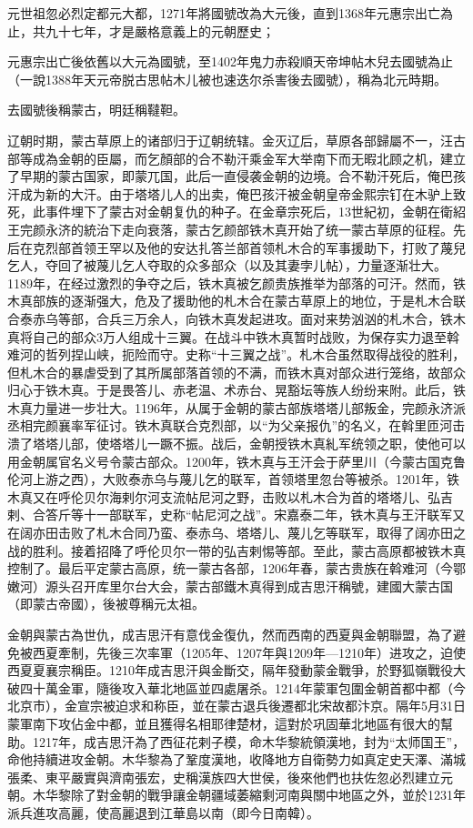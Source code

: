 元世祖忽必烈定都元大都，1271年將國號改為大元後，直到1368年元惠宗出亡為止，共九十七年，才是嚴格意義上的元朝歷史；

元惠宗出亡後依舊以大元為國號，至1402年鬼力赤殺順天帝坤帖木兒去國號為止（一說1388年天元帝脱古思帖木儿被也速迭尔杀害後去國號），稱為北元時期。

去國號後稱蒙古，明廷稱韃靼。

辽朝时期，蒙古草原上的诸部归于辽朝统辖。金灭辽后，草原各部歸屬不一，汪古部等成為金朝的臣屬，而乞顏部的合不勒汗乘金军大举南下而无暇北顾之机，建立了早期的蒙古国家，即蒙兀国，此后一直侵袭金朝的边境。合不勒汗死后，俺巴孩汗成为新的大汗。由于塔塔儿人的出卖，俺巴孩汗被金朝皇帝金熙宗钉在木驴上致死，此事件埋下了蒙古对金朝复仇的种子。在金章宗死后，13世紀初，金朝在衛紹王完颜永济的統治下走向衰落，蒙古乞颜部铁木真开始了统一蒙古草原的征程。先后在克烈部首领王罕以及他的安达扎答兰部首领札木合的军事援助下，打败了蔑兒乞人，夺回了被蔑儿乞人夺取的众多部众（以及其妻孛儿帖），力量逐渐壮大。1189年，在经过激烈的争夺之后，铁木真被乞颜贵族推举为部落的可汗。然而，铁木真部族的逐渐强大，危及了援助他的札木合在蒙古草原上的地位，于是札木合联合泰赤乌等部，合兵三万余人，向铁木真发起进攻。面对来势汹汹的札木合，铁木真将自己的部众3万人组成十三翼。在战斗中铁木真暂时战败，为保存实力退至斡难河的哲列捏山峡，扼险而守。史称“十三翼之战”。札木合虽然取得战役的胜利，但札木合的暴虐受到了其所属部落首领的不满，而铁木真对部众进行笼络，故部众归心于铁木真。于是畏答儿、赤老温、术赤台、晃豁坛等族人纷纷来附。此后，铁木真力量进一步壮大。1196年，从属于金朝的蒙古部族塔塔儿部叛金，完颜永济派丞相完颜襄率军征讨。铁木真联合克烈部，以“为父亲报仇”的名义，在斡里匝河击溃了塔塔儿部，使塔塔儿一蹶不振。战后，金朝授铁木真糺军统领之职，使他可以用金朝属官名义号令蒙古部众。1200年，铁木真与王汗会于萨里川（今蒙古国克鲁伦河上游之西），大败泰赤乌与蔑儿乞的联军，首领塔里忽台等被杀。1201年，铁木真又在呼伦贝尔海剌尔河支流帖尼河之野，击败以札木合为首的塔塔儿、弘吉剌、合答斤等十一部联军，史称“帖尼河之战”。宋嘉泰二年，铁木真与王汗联军又在阔亦田击败了札木合同乃蛮、泰赤乌、塔塔儿、蔑儿乞等联军，取得了阔亦田之战的胜利。接着招降了呼伦贝尔一带的弘吉剌惕等部。至此，蒙古高原都被铁木真控制了。最后平定蒙古高原，统一蒙古各部，1206年春，蒙古贵族在斡难河（今鄂嫩河）源头召开库里尔台大会，蒙古部鐵木真得到成吉思汗稱號，建國大蒙古国（即蒙古帝國），後被尊稱元太祖。

金朝與蒙古為世仇，成吉思汗有意伐金復仇，然而西南的西夏與金朝聯盟，為了避免被西夏牽制，先後三次率軍（1205年、1207年與1209年—1210年）进攻之，迫使西夏夏襄宗稱臣。1210年成吉思汗與金斷交，隔年發動蒙金戰爭，於野狐嶺戰役大破四十萬金軍，隨後攻入華北地區並四處屠杀。1214年蒙軍包圍金朝首都中都（今北京市），金宣宗被迫求和称臣，並在蒙古退兵後遷都北宋故都汴京。隔年5月31日蒙軍南下攻佔金中都，並且獲得名相耶律楚材，這對於巩固華北地區有很大的幫助。1217年，成吉思汗為了西征花剌子模，命木华黎統領漢地，封为“太师国王”，命他持續进攻金朝。木华黎為了鞏度漢地，收降地方自衛勢力如真定史天澤、滿城張柔、東平嚴實與濟南張宏，史稱漢族四大世侯，後來他們也扶佐忽必烈建立元朝。木华黎除了對金朝的戰爭讓金朝疆域萎縮剩河南與關中地區之外，並於1231年派兵進攻高麗，使高麗退到江華島以南（即今日南韓）。

